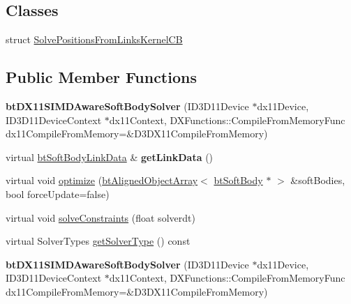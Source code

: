 \subsection*{Classes}
\begin{DoxyCompactItemize}
\item 
struct \hyperlink{structbtDX11SIMDAwareSoftBodySolver_1_1SolvePositionsFromLinksKernelCB}{Solve\+Positions\+From\+Links\+Kernel\+CB}
\end{DoxyCompactItemize}
\subsection*{Public Member Functions}
\begin{DoxyCompactItemize}
\item 
\mbox{\label{classbtDX11SIMDAwareSoftBodySolver_aa01252079f411bddde26f0836209c4a8}} 
{\bfseries bt\+D\+X11\+S\+I\+M\+D\+Aware\+Soft\+Body\+Solver} (I\+D3\+D11\+Device $\ast$dx11\+Device, I\+D3\+D11\+Device\+Context $\ast$dx11\+Context, D\+X\+Functions\+::\+Compile\+From\+Memory\+Func dx11\+Compile\+From\+Memory=\&D3\+D\+X11\+Compile\+From\+Memory)
\item 
\mbox{\label{classbtDX11SIMDAwareSoftBodySolver_a2c7059670bbf3653f1828114ccf28e8e}} 
virtual \hyperlink{classbtSoftBodyLinkData}{bt\+Soft\+Body\+Link\+Data} \& {\bfseries get\+Link\+Data} ()
\item 
virtual void \hyperlink{classbtDX11SIMDAwareSoftBodySolver_a575cf63485ef6a9a55f045e13dcb7717}{optimize} (\hyperlink{classbtAlignedObjectArray}{bt\+Aligned\+Object\+Array}$<$ \hyperlink{classbtSoftBody}{bt\+Soft\+Body} $\ast$ $>$ \&soft\+Bodies, bool force\+Update=false)
\item 
virtual void \hyperlink{classbtDX11SIMDAwareSoftBodySolver_ae78972e067e72a8b5cb51ad05def50df}{solve\+Constraints} (float solverdt)
\item 
virtual Solver\+Types \hyperlink{classbtDX11SIMDAwareSoftBodySolver_ad36369c7c58e1cb8ddea7ebd54612eb9}{get\+Solver\+Type} () const
\item 
\mbox{\label{classbtDX11SIMDAwareSoftBodySolver_aa01252079f411bddde26f0836209c4a8}} 
{\bfseries bt\+D\+X11\+S\+I\+M\+D\+Aware\+Soft\+Body\+Solver} (I\+D3\+D11\+Device $\ast$dx11\+Device, I\+D3\+D11\+Device\+Context $\ast$dx11\+Context, D\+X\+Functions\+::\+Compile\+From\+Memory\+Func dx11\+Compile\+From\+Memory=\&D3\+D\+X11\+Compile\+From\+Memory)

\end{DoxyCompactItemize}
